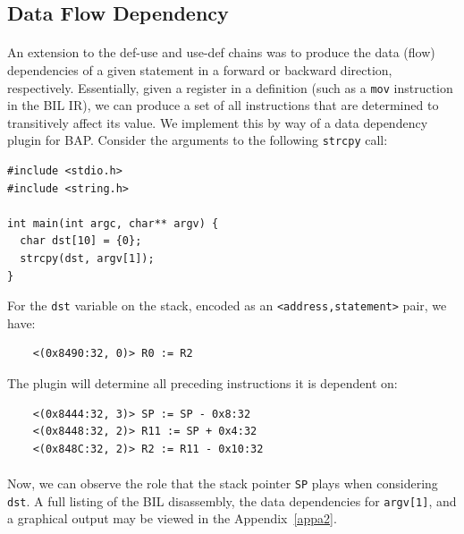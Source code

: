 \documentclass[letterpaper,11pt]{article}
\begin{document}
\subsection{Data Flow Dependency}

\paragraph{}
An extension to the def-use and use-def chains was to produce the data (flow)
dependencies of a given statement in a forward or backward direction,
respectively. Essentially, given a register in a definition (such as a \texttt{mov}
instruction in the BIL IR), we can produce a set of all instructions that are
determined to transitively affect its value. We implement this
by way of a data dependency plugin for BAP. Consider the arguments to the
following \texttt{strcpy} call:

\begin{center}
\lstset{language=C, label=strcpy_src,
caption=strcpy.c, breaklines=true, basicstyle=\tiny, numbers=none}
\begin{lstlisting}
#include <stdio.h>
#include <string.h>

int main(int argc, char** argv) {
  char dst[10] = {0};
  strcpy(dst, argv[1]);
}
\end{lstlisting}
\end{center}

For the \texttt{dst} variable on the stack, encoded as an
\texttt{<address,statement>} pair, we have:

\begin{verbatim}
    <(0x8490:32, 0)> R0 := R2
\end{verbatim}

The plugin will determine all preceding instructions it is dependent on:

\begin{verbatim}
    <(0x8444:32, 3)> SP := SP - 0x8:32
    <(0x8448:32, 2)> R11 := SP + 0x4:32
    <(0x848C:32, 2)> R2 := R11 - 0x10:32
\end{verbatim}

\paragraph{}
Now, we can observe the role that the stack pointer \texttt{SP} plays
when considering \texttt{dst}. A full listing of the BIL disassembly,
the data dependencies for \texttt{argv[1]}, and a graphical
output may be viewed in the Appendix~\ref{appa2}.
\end{document}
